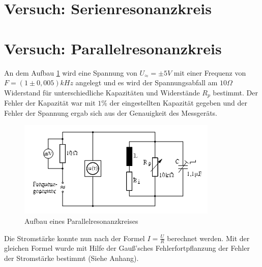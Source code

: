 \section{Versuch: Serienresonanzkreis}
\section{Versuch: Parallelresonanzkreis}
An dem Aufbau \ref{fig:aufbauparallel} wird eine Spannung von $U_\approx=\pm 5V$ mit einer Frequenz von $F=(1 \pm 0,005) kHz$ angelegt und es wird der Spannungsabfall am $10\Omega$ Widerstand für unterschiedliche Kapazitäten und Widerstände $R_p$ bestimmt. Der Fehler der Kapazität war mit $1\% $ der eingestellten Kapazität gegeben und der Fehler der Spannung ergab sich aus der Genauigkeit des Messgeräts.
\begin{figure}[h]
  \centering
  \includegraphics[width=.9\textwidth]{Bauplanparall.png}
  \caption{Aufbau eines Parallelresonanzkreises}
  \label{fig:aufbauparallel}
\end{figure}
 Die Stromstärke konnte nun nach der Formel $I=\frac{U}{R}$ berechnet werden. Mit der gleichen Formel wurde mit Hilfe der Gauß'sches Fehlerfortpflanzung der Fehler der Stromstärke bestimmt (Siehe Anhang).
